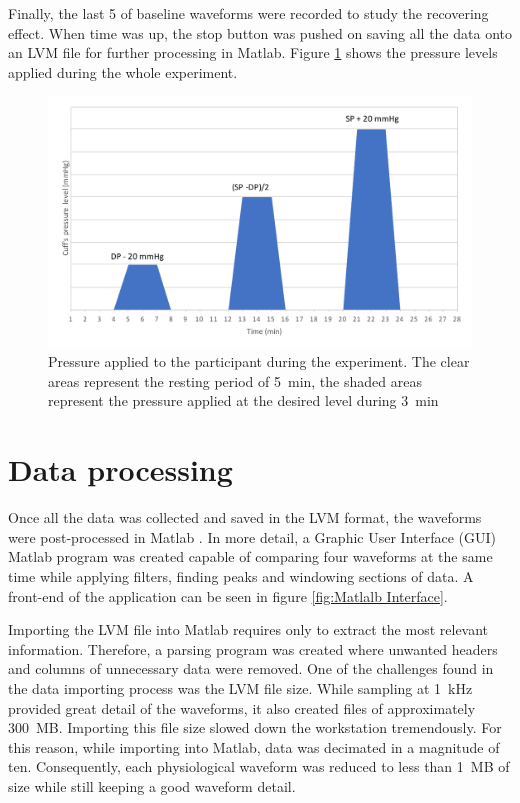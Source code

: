 Finally, the last \SI{5}{\min} of baseline waveforms were recorded to study the recovering effect. When time was up, the stop button was pushed on saving all the data onto an LVM file for further processing in Matlab. Figure \ref{fig:pressure applied} shows the pressure levels applied during the whole experiment.

\begin{figure}[!htpb]
	\centering
	\includegraphics[width=15cm,keepaspectratio]{figure3}
	\caption{Pressure applied to the participant during the experiment. The clear areas represent the resting period of \SI{5}{\minute}, the shaded areas represent the pressure applied at the desired level during \SI{3}{\minute}}
	\label{fig:pressure applied}
\end{figure}

\section{Data processing}
\label{section procedure 2}
Once all the data was collected and saved in the LVM format, the waveforms were post-processed in Matlab \cite{MATLAB:2016}. In more detail, a Graphic User Interface (GUI) Matlab program was created capable of comparing four waveforms at the same time while applying filters, finding peaks and windowing sections of data. A front-end of the application can be seen in figure \ref{fig:Matlalb Interface}.

Importing the LVM file into Matlab requires only to extract the most relevant information. Therefore, a parsing program was created where unwanted headers and columns of unnecessary data were removed. One of the challenges found in the data importing process was the LVM file size. While sampling at \SI{1}{\kilo\hertz} provided great detail of the waveforms, it also created files of approximately \SI{300}{MB}. Importing this file size slowed down the workstation tremendously. For this reason, while importing into Matlab, data was decimated in a magnitude of ten. Consequently, each physiological waveform was reduced to less than \SI{1}{MB} of size while still keeping a good waveform detail. 

